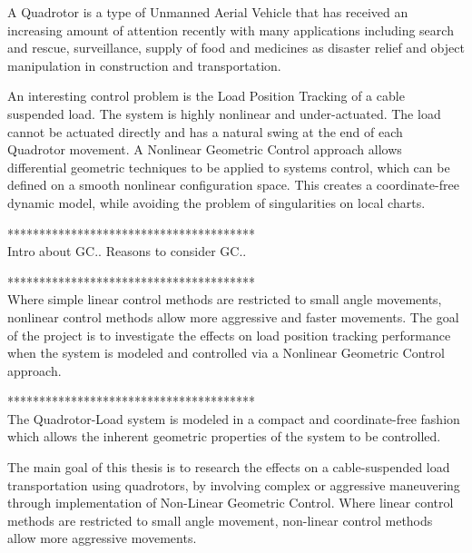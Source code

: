 
A Quadrotor is a type of Unmanned Aerial Vehicle that has received an increasing amount of attention recently with many applications including search and rescue, surveillance, supply of food and medicines as disaster relief and object manipulation in construction and transportation.

An interesting control problem is the Load Position Tracking of a cable suspended load. The system is highly nonlinear and under-actuated. The load cannot be actuated directly and has a natural swing at the end of each Quadrotor movement. A Nonlinear Geometric Control approach allows differential geometric techniques to be applied to systems control, which can be defined on a smooth nonlinear configuration space. This creates a coordinate-free dynamic model, while avoiding the problem of singularities on local charts. 


***************************************\\
Intro about GC.. 
Reasons to consider GC..

***************************************\\
Where simple linear control methods are restricted to small angle movements, nonlinear control methods allow more aggressive and faster movements.  The goal of the project is to investigate the effects on load position tracking performance when the system is modeled and controlled via a Nonlinear Geometric Control approach.


***************************************\\
The Quadrotor-Load system is modeled in a compact and coordinate-free fashion which allows the inherent geometric properties of the system to be controlled. 


The main goal of this thesis is to research the effects on a cable-suspended load transportation using quadrotors, by involving complex or aggressive maneuvering through implementation of Non-Linear Geometric Control.
Where linear control methods are restricted to small angle movement, non-linear control methods allow more aggressive movements. 

%
%		


